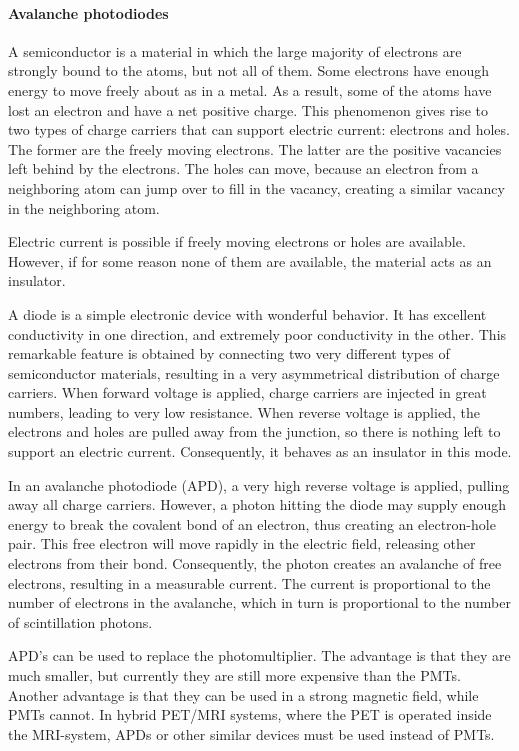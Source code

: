 \documentclass[11pt,oneside]{article}
\begin{document}
\paragraph{Avalanche photodiodes}
A semiconductor is a material in which the large majority of electrons are
strongly bound to the atoms, but not all of them. Some electrons have enough
energy to move freely about as in a metal. As a result, some of the atoms
have lost an electron and have a net positive charge. This phenomenon gives
rise to two types of charge carriers that can support electric current:
electrons and holes. The former are the freely moving electrons. The latter
are the positive vacancies left behind by the electrons. The holes can move,
because an electron from a neighboring atom can jump over to fill in the
vacancy, creating a similar vacancy in the neighboring atom.

Electric current is possible if freely moving electrons or holes are
available. However, if for some reason none of them are available, the
material acts as an insulator.

A diode is a simple electronic device with wonderful behavior. It has
excellent conductivity in one direction, and extremely poor conductivity in
the other.  This remarkable feature is obtained by connecting two very
different types of semiconductor materials, resulting in a very asymmetrical
distribution of charge carriers. When forward voltage is applied, charge
carriers are injected in great numbers, leading to very low resistance. When
reverse voltage is applied, the electrons and holes are pulled away from the
junction, so there is nothing left to support an electric
current. Consequently, it behaves as an insulator in this mode.

In an avalanche photodiode (APD), a very high reverse voltage is applied,
pulling away all charge carriers. However, a photon hitting the diode may
supply enough energy to break the covalent bond of an electron, thus
creating an electron-hole pair. This free electron will move rapidly in the
electric field, releasing other electrons from their bond. Consequently, the
photon creates an avalanche of free electrons, resulting in a measurable
current. The current is proportional to the number of electrons in the
avalanche, which in turn is proportional to the number of
scintillation photons.

APD's can be used to replace the photomultiplier. The advantage is
that they are much smaller, but currently they are still more
expensive than the PMTs. Another advantage is that they can be used in
a strong magnetic field, while PMTs cannot. In hybrid PET/MRI systems,
where the PET is operated inside the MRI-system, APDs or other similar
devices must be used instead of PMTs.
\end{document}
